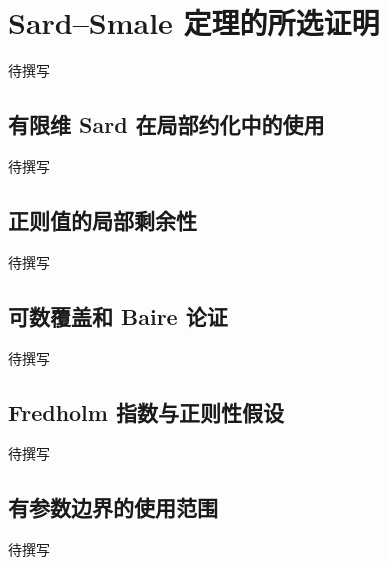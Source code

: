 
% 
% 

\section{Sard–Smale 定理的所选证明}
\label{g4:sec:2303}

待撰写

\subsection{有限维 Sard 在局部约化中的使用}
\label{g4:subsec:2303:01}
待撰写

\subsection{正则值的局部剩余性}
\label{g4:subsec:2303:02}
待撰写

\subsection{可数覆盖和 Baire 论证}
\label{g4:subsec:2303:03}
待撰写

\subsection{Fredholm 指数与正则性假设}
\label{g4:subsec:2303:04}
待撰写

\subsection{有参数边界的使用范围}
\label{g4:subsec:2303:05}
待撰写
